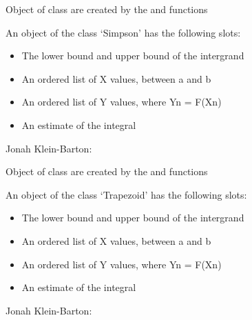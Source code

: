 \documentclass[a4paper]{book}
\begin{document}
%
\begin{Description}\relax
Object of class  are created by the  and  functions
\end{Description}
%
\begin{Details}\relax
An object of the class `Simpson' has the following slots:
\begin{itemize}

\item {} The lower bound and upper bound of the intergrand
\item {} An ordered list of X values, between a and b
\item {} An ordered list of Y values, where Yn = F(Xn)
\item {} An estimate of the integral

\end{itemize}

\end{Details}
%
\begin{Author}\relax
Jonah Klein-Barton: 
\end{Author}
%
\begin{Description}\relax
Object of class  are created by the  and  functions
\end{Description}
%
\begin{Details}\relax
An object of the class `Trapezoid' has the following slots:
\begin{itemize}

\item {} The lower bound and upper bound of the intergrand
\item {} An ordered list of X values, between a and b
\item {} An ordered list of Y values, where Yn = F(Xn)
\item {} An estimate of the integral

\end{itemize}

\end{Details}
%
\begin{Author}\relax
Jonah Klein-Barton: 
\end{Author}
\printindex{}
\end{document}
